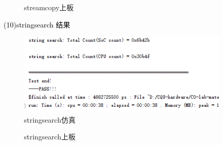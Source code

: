 \begin{figure}[htbp]
    \centering
    \caption{streamcopy上板}
\end{figure}

\textcolor{black}{(10)stringsearch 结果}\\
\begin{figure}[htbp]
    \centering
    \includegraphics[width=0.9\textwidth]{image/stringsearchS.png}
    \caption{stringsearch仿真}
\end{figure}

\begin{figure}[htbp]
    \centering
    \caption{stringsearch上板}
\end{figure}
